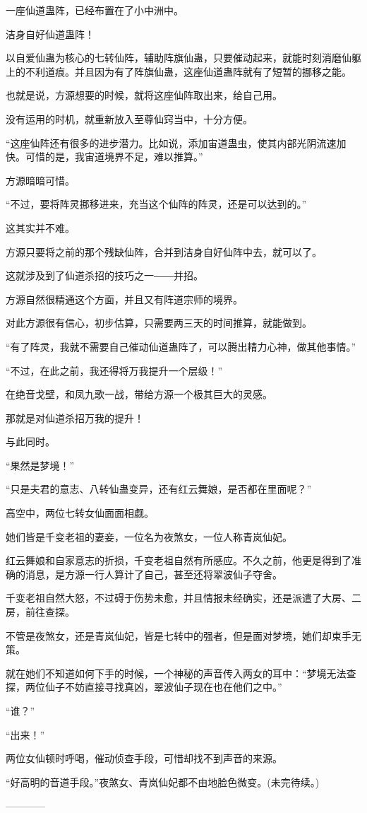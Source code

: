 \begin{this_body}
一座仙道蛊阵，已经布置在了小中洲中。

洁身自好仙道蛊阵！

以自爱仙蛊为核心的七转仙阵，辅助阵旗仙蛊，只要催动起来，就能时刻消磨仙躯上的不利道痕。并且因为有了阵旗仙蛊，这座仙道蛊阵就有了短暂的挪移之能。

也就是说，方源想要的时候，就将这座仙阵取出来，给自己用。

没有运用的时机，就重新放入至尊仙窍当中，十分方便。

“这座仙阵还有很多的进步潜力。比如说，添加宙道蛊虫，使其内部光阴流速加快。可惜的是，我宙道境界不足，难以推算。”

方源暗暗可惜。

“不过，要将阵灵挪移进来，充当这个仙阵的阵灵，还是可以达到的。”

这其实并不难。

方源只要将之前的那个残缺仙阵，合并到洁身自好仙阵中去，就可以了。

这就涉及到了仙道杀招的技巧之一――并招。

方源自然很精通这个方面，并且又有阵道宗师的境界。

对此方源很有信心，初步估算，只需要两三天的时间推算，就能做到。

“有了阵灵，我就不需要自己催动仙道蛊阵了，可以腾出精力心神，做其他事情。”

“不过，在此之前，我还得将万我提升一个层级！”

在绝音戈壁，和凤九歌一战，带给方源一个极其巨大的灵感。

那就是对仙道杀招万我的提升！

与此同时。

“果然是梦境！”

“只是夫君的意志、八转仙蛊变异，还有红云舞娘，是否都在里面呢？”

高空中，两位七转女仙面面相觑。

她们皆是千变老祖的妻妾，一位名为夜煞女，一位人称青岚仙妃。

红云舞娘和自家意志的折损，千变老祖自然有所感应。不久之前，他更是得到了准确的消息，是方源一行人算计了自己，甚至还将翠波仙子夺舍。

千变老祖自然大怒，不过碍于伤势未愈，并且情报未经确实，还是派遣了大房、二房，前往查探。

不管是夜煞女，还是青岚仙妃，皆是七转中的强者，但是面对梦境，她们却束手无策。

就在她们不知道如何下手的时候，一个神秘的声音传入两女的耳中：“梦境无法查探，两位仙子不妨直接寻找真凶，翠波仙子现在也在他们之中。”

“谁？”

“出来！”

两位女仙顿时呼喝，催动侦查手段，可惜却找不到声音的来源。

“好高明的音道手段。”夜煞女、青岚仙妃都不由地脸色微变。(未完待续。)

------------

\end{this_body}

